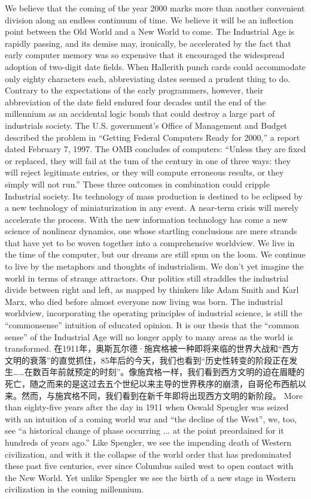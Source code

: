 \begin{paracol}{2}
\switchcolumn
We believe that the coming of the year 2000 marks more than another convenient division along an endless continuum of time. We believe it will be an inflection point between the Old World and a New World to come. The Industrial Age is rapidly passing, and its demise may, ironically, be accelerated by the fact that early computer memory was so expensive that it encouraged the widespread adoption of two-digit date fields. When Hallerith punch cards could accommodate only eighty characters each, abbreviating dates seemed a prudent thing to do. Contrary to the expectations of the early programmers, however, their abbreviation of the date field endured four decades until the end of the millennium as an accidental logic bomb that could destroy a large part of industrials society. The U.S. government's Office of Management and Budget described the problem in ``Getting Federal Computers Ready for 2000,'' a report dated February 7, 1997. The OMB concludes of computers: ``Unless they are fixed or replaced, they will fail at the tum of the century in one of three ways: they will reject legitimate entries, or they will compute erroneous results, or they simply will not run.'' These three outcomes in combination could cripple Industrial society. Its technology of mass production is destined to be eclipsed by a new technology of miniaturization in any event. A near-term crisis will merely accelerate the process. With the new information technology has come a new science of nonlinear dynamics, one whose startling conclusions are mere strands that have yet to be woven together into a comprehensive worldview. We live in the time of the computer, but our dreams are still spun on the loom. We continue to live by the metaphors and thoughts of industrialism. We don't yet imagine the world in terms of strange attractors. Our politics still straddles the industrial divide between right and left, as mapped by thinkers like Adam Smith and Karl Marx, who died before almost everyone now living was born. The industrial worldview, incorporating the operating principles of industrial science, is still the ``commonsense'' intuition of educated opinion. It is our thesis that the ``common sense'' of the Industrial Age will no longer apply to many areas as the world is transformed.
\switchcolumn*
在1911年，奥斯瓦尔德·施宾格被一种即将来临的世界大战和“西方文明的衰落”的直觉抓住，85年后的今天，我们也看到“历史性转变的阶段正在发生……在数百年前就预定的时刻”。像施宾格一样，我们看到西方文明的迫在眉睫的死亡，随之而来的是这过去五个世纪以来主导的世界秩序的崩溃，自哥伦布西航以来。然而，与施宾格不同，我们看到在新千年即将出现西方文明的新阶段。
\switchcolumn
More than eighty-five years after the day in 1911 when Oswald Spengler was seized with an intuition of a coming world war and ``the decline of the West'', we, too, see ``a historical change of phase occurring ... at the point preordained for it hundreds of years ago.'' Like Spengler, we see the impending death of Western civilization, and with it the collapse of the world order that has predominated these past five centuries, ever since Columbus sailed west to open contact with the New World. Yet unlike Spengler we see the birth of a new stage in Western civilization in the coming millennium.
\end{paracol}